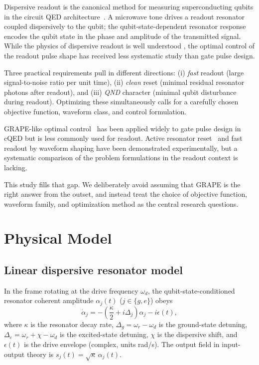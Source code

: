 \documentclass[twocolumn,prl,aps,floatfix]{revtex4-2}
\begin{document}
Dispersive readout is the canonical method for measuring superconducting qubits in the
circuit QED architecture~\cite{blais2021circuit,krantz2019quantum}.  A microwave tone
drives a readout resonator coupled dispersively to the qubit; the qubit-state-dependent
resonator response encodes the qubit state in the phase and amplitude of the transmitted
signal.  While the physics of dispersive readout is well understood
\cite{gambetta2007protocols,boissonneault2010dispersive}, the optimal control
of the readout pulse shape has received less systematic study than gate pulse design.

Three practical requirements pull in different directions:
(i) \emph{fast} readout (large signal-to-noise ratio per unit time),
(ii) \emph{clean} reset (minimal residual resonator photons after readout), and
(iii) \emph{QND} character (minimal qubit disturbance during readout).
Optimizing these simultaneously calls for a carefully chosen objective function,
waveform class, and control formulation.

GRAPE-like optimal control~\cite{khaneja2005optimal} has been applied widely to gate
pulse design in cQED but is less commonly used for readout.  Active resonator
reset~\cite{reed2010fast,McClure2016rapid} and fast readout by waveform shaping
\cite{walter2017rapid,jeffrey2014fast} have been demonstrated experimentally, but a
systematic comparison of the problem formulations in the readout context is lacking.

This study fills that gap. We deliberately avoid assuming that GRAPE is the right answer
from the outset, and instead treat the choice of objective function, waveform family,
and optimization method as the central research questions.

\section{Physical Model}

\subsection{Linear dispersive resonator model}

In the frame rotating at the drive frequency $\omega_d$, the qubit-state-conditioned
resonator coherent amplitude $\alpha_j(t)$ ($j \in \{g, e\}$) obeys
\begin{equation}
  \dot{\alpha}_j = -\!\left(\frac{\kappa}{2} + i\Delta_j\right)\alpha_j - i\epsilon(t),
  \label{eq:ode}
\end{equation}
where $\kappa$ is the resonator decay rate, $\Delta_g = \omega_r - \omega_d$ is the
ground-state detuning, $\Delta_e = \omega_r + \chi - \omega_d$ is the excited-state
detuning, $\chi$ is the dispersive shift, and $\epsilon(t)$ is the drive envelope
(complex, units rad/s).  The output field in input-output theory is
$s_j(t) = \sqrt{\kappa}\,\alpha_j(t)$.
\end{document}
